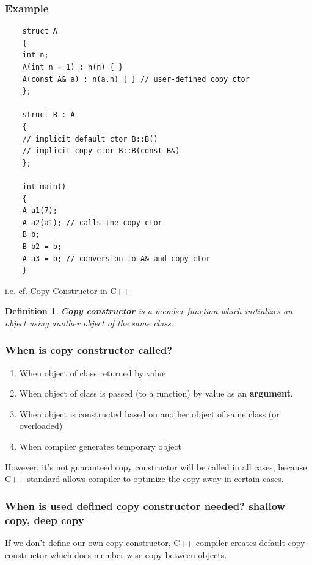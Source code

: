 \documentclass[10pt]{amsart}
\newtheorem{definition}{Definition}
\begin{document}
\subsubsection{Example}  
	
	\begin{lstlisting}
	struct A
	{
	int n;
	A(int n = 1) : n(n) { }
	A(const A& a) : n(a.n) { } // user-defined copy ctor
	};
	
	struct B : A
	{
	// implicit default ctor B::B()
	// implicit copy ctor B::B(const B&)
	};
	
	int main()
	{
	A a1(7);
	A a2(a1); // calls the copy ctor
	B b;
	B b2 = b;
	A a3 = b; // conversion to A& and copy ctor  
	}
	\end{lstlisting}  

i.e. cf. \href{http://www.geeksforgeeks.org/copy-constructor-in-cpp/}{Copy Constructor in C++}

\begin{definition}
	\textbf{Copy constructor} is a member function which initializes an object using another object of the same class.  
\end{definition}

\subsubsection{When is copy constructor called? } 
\begin{enumerate}
	\item When object of class returned by value 
	\item When object of class is passed (to a function) by value as an \textbf{argument}.  
	\item When object is constructed based on another object of same class  (or overloaded)  
	\item When compiler generates temporary object  
\end{enumerate}


However, it's not guaranteed copy constructor will be called in all cases, because C++ standard allows compiler to optimize the copy away in certain cases.  

\subsubsection{When is used defined copy constructor needed?  shallow copy, deep copy}  

If we don't define our own copy constructor, C++ compiler creates default copy constructor which does member-wise copy between objects.  
\end{document}
